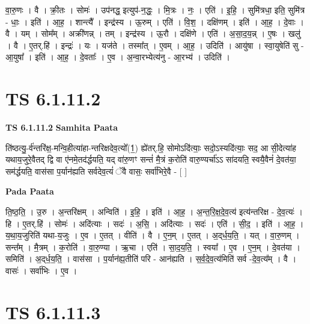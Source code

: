 \documentclass[17pt]{extarticle}
\begin{document}
वा॒रु॒णः । वै । क्री॒तः । सोमः॑ । उप॑नद्ध॒ इत्युप॑-न॒द्धः॒ । मि॒त्रः । नः॒ । एति॑ । इ॒हि॒ । सुमि॑त्रधा॒ इति॒ सुमि॑त्र - धाः॒ । इति॑ । आ॒ह॒ । शान्त्यै᳚ । इन्द्र॑स्य । ऊ॒रुम् । एति॑ । वि॒श॒ । दक्षि॑णम् । इति॑ । आ॒ह॒ । दे॒वाः । वै । यम् । सोम᳚म् । अक्री॑णन्न् । तम् । इन्द्र॑स्य । ऊ॒रौ । दक्षि॑णे । एति॑ । अ॒सा॒द॒य॒न्न् । ए॒षः । खलु॑ । वै । ए॒तर्.हि॑ । इन्द्रः॑ । यः । यज॑ते । तस्मा᳚त् । ए॒वम् । आ॒ह॒ । उदिति॑ । आयु॑षा । स्वा॒युषेति॑ सु - आ॒युषा᳚ । इति॑ । आ॒ह॒ । दे॒वताः᳚ । ए॒व । अ॒न्वा॒रभ्येत्य॑नु - आ॒रभ्य॑ । उदिति॑ ।  \newline





\section{ TS 6.1.11.2 }

\textbf{TS 6.1.11.2 } \newline
\textbf{Samhita Paata} \newline

ति॑ष्ठत्यु॒-र्व॑न्तरि॑क्ष॒-मन्वि॒हीत्या॑हा-न्तरिक्षदेव॒त्यो᳚(1॒) ह्ये॑तर्.हि॒ सोमोऽदि॑त्याः॒ सदो॒ऽस्यदि॑त्याः॒ सद॒ आ सी॒देत्या॑ह यथाय॒जुरे॒वैतद् द्वि वा ए॑नमे॒तद॑र्द्धयति॒ यद् वा॑रु॒णꣳ सन्तं॑ मै॒त्रं क॒रोति॑ वारु॒ण्यर्चा॑ऽऽ सा॑दयति॒ स्वयै॒वैनं॑ दे॒वत॑या॒ सम॑र्द्धयति॒ वास॑सा प॒र्यान॑ह्यति सर्वदेव॒त्यं॑ ॅवै वासः॒ सर्वा॑भिरे॒वै - [  ] \newline

\textbf{Pada Paata} \newline

ति॒ष्ठ॒ति॒ । उ॒रु । अ॒न्तरि॑क्षम् । अन्विति॑ । इ॒हि॒ । इति॑ । आ॒ह॒ । अ॒न्त॒रि॒क्ष॒दे॒व॒त्य॑ इत्य॑न्तरिक्ष - दे॒व॒त्यः॑ । हि । ए॒तर्.हि॑ । सोमः॑ । अदि॑त्याः । सदः॑ । अ॒सि॒ । अदि॑त्याः । सदः॑ । एति॑ । सी॒द॒ । इति॑ । आ॒ह॒ । य॒था॒य॒जुरिति॑ यथा-य॒जुः । ए॒व । ए॒तत् । वीति॑ । वै । ए॒न॒म् । ए॒तत् । अ॒द्‌र्ध॒य॒ति॒ । यत् । वा॒रु॒णम् । सन्त᳚म् । मै॒त्रम् । क॒रोति॑ । वा॒रु॒ण्या । ऋ॒चा । एति॑ । सा॒द॒य॒ति॒ । स्वया᳚ । ए॒व । ए॒न॒म् । दे॒वत॑या । समिति॑ । अ॒द्‌र्ध॒य॒ति॒ । वास॑सा । प॒र्यान॑ह्य॒तीति॑ परि - आन॑ह्यति । स॒र्व॒दे॒व॒त्य॑मिति॑ सर्व -दे॒व॒त्य᳚म् । वै । वासः॑ । सर्वा॑भिः । ए॒व ।  \newline





\section{ TS 6.1.11.3 }
\end{document}

